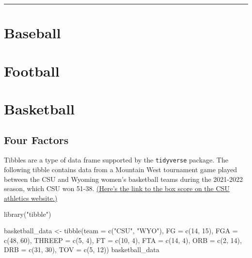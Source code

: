 \documentclass[
  11pt,
]{book}
\newenvironment{Shaded}{\begin{snugshade}}{\end{snugshade}}
\newcommand{\AttributeTok}[1]{\textcolor[rgb]{0.77,0.63,0.00}{#1}}
\newcommand{\DecValTok}[1]{\textcolor[rgb]{0.00,0.00,0.81}{#1}}
\newcommand{\FunctionTok}[1]{\textcolor[rgb]{0.00,0.00,0.00}{#1}}
\newcommand{\NormalTok}[1]{#1}
\newcommand{\OtherTok}[1]{\textcolor[rgb]{0.56,0.35,0.01}{#1}}
\newcommand{\StringTok}[1]{\textcolor[rgb]{0.31,0.60,0.02}{#1}}
\theoremstyle{definition}
\theoremstyle{definition}
\theoremstyle{definition}
\theoremstyle{definition}
\theoremstyle{remark}
\begin{document}
\begin{center}\rule{0.5\linewidth}{0.5pt}\end{center}

\hypertarget{baseball}{%
\section{Baseball}\label{baseball}}

\hypertarget{football}{%
\section{Football}\label{football}}

\hypertarget{basketball}{%
\section{Basketball}\label{basketball}}

\hypertarget{four-factors}{%
\subsection{Four Factors}\label{four-factors}}

Tibbles are a type of data frame supported by the \texttt{tidyverse} package. The following tibble contains data from a Mountain West tournament game played between the CSU and Wyoming women's basketball teams during the 2021-2022 season, which CSU won 51-38. \href{https://csurams.com/sports/womens-basketball/stats/2021-22/wyoming/boxscore/16095}{(Here's the link to the box score on the CSU athletics website.)}

\begin{Shaded}
\begin{Highlighting}[]
\FunctionTok{library}\NormalTok{(}\StringTok{"tibble"}\NormalTok{)}

\NormalTok{basketball\_data }\OtherTok{\textless{}{-}} \FunctionTok{tibble}\NormalTok{(}\AttributeTok{team =} \FunctionTok{c}\NormalTok{(}\StringTok{"CSU"}\NormalTok{, }\StringTok{"WYO"}\NormalTok{), }\AttributeTok{FG =} \FunctionTok{c}\NormalTok{(}\DecValTok{14}\NormalTok{, }\DecValTok{15}\NormalTok{), }\AttributeTok{FGA =} \FunctionTok{c}\NormalTok{(}\DecValTok{48}\NormalTok{, }\DecValTok{60}\NormalTok{),}
    \AttributeTok{THREEP =} \FunctionTok{c}\NormalTok{(}\DecValTok{5}\NormalTok{, }\DecValTok{4}\NormalTok{), }\AttributeTok{FT =} \FunctionTok{c}\NormalTok{(}\DecValTok{10}\NormalTok{, }\DecValTok{4}\NormalTok{), }\AttributeTok{FTA =} \FunctionTok{c}\NormalTok{(}\DecValTok{14}\NormalTok{, }\DecValTok{4}\NormalTok{), }\AttributeTok{ORB =} \FunctionTok{c}\NormalTok{(}\DecValTok{2}\NormalTok{, }\DecValTok{14}\NormalTok{), }\AttributeTok{DRB =} \FunctionTok{c}\NormalTok{(}\DecValTok{31}\NormalTok{,}
        \DecValTok{30}\NormalTok{), }\AttributeTok{TOV =} \FunctionTok{c}\NormalTok{(}\DecValTok{5}\NormalTok{, }\DecValTok{12}\NormalTok{))}
\NormalTok{basketball\_data}
\end{Highlighting}
\end{Shaded}
\end{document}
